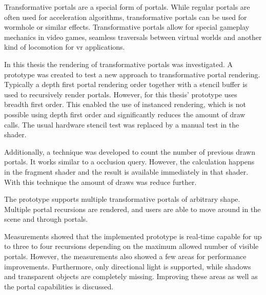 
Transformative portals are a special form of portals. While regular portals are often used for acceleration algorithms, transformative portals can be used for wormhole or similar effects. Transformative portals allow for special gameplay mechanics in video games, seamless traversals between virtual worlds and another kind of locomotion for \gls{vr} applications.

In this thesis the rendering of transformative portals was investigated. A prototype was created to test a new approach to transformative portal rendering. Typically a depth first portal rendering order together with a stencil buffer is used to recursively render portals. However, for this thesis' prototype uses breadth first order. This enabled the use of instanced rendering, which is not possible using depth first order and significantly reduces the amount of draw calls. The usual hardware stencil test was replaced by a manual test in the shader.

Additionally, a technique was developed to count the number of previous drawn portals. It works similar to a occlusion query. However, the calculation happens in the fragment shader and the result is available immediately in that shader. With this technique the amount of draws was reduce further.

The prototype supports multiple transformative portals of arbitrary shape. Multiple portal recursions are rendered, and users are able to move around in the scene and through portals.

Measurements showed that the implemented prototype is real-time capable for up to three to four recursions depending on the maximum allowed number of visible portals. However, the measurements also showed a few areas for performance improvements. Furthermore, only directional light is supported, while shadows and transparent objects are completely missing. Improving these areas as well as the portal capabilities is discussed.
